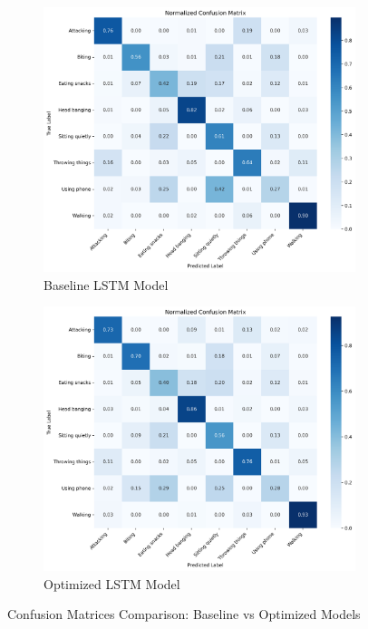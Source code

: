\documentclass[a4paper,11pt]{article}
\begin{document}
\begin{figure}[H]
\centering
\begin{subfigure}{0.48\textwidth}
    \centering
    \includegraphics[width=\textwidth]{results/metrics/baseline/confusion_matrix.png}
    \caption{Baseline LSTM Model}
    \label{fig:baseline_confusion}
\end{subfigure}
\hfill
\begin{subfigure}{0.48\textwidth}
    \centering
    \includegraphics[width=\textwidth]{results/metrics/optimized/confusion_matrix.png}
    \caption{Optimized LSTM Model}
    \label{fig:optimized_confusion}
\end{subfigure}
\caption{Confusion Matrices Comparison: Baseline vs Optimized Models}
\label{fig:confusion_matrices}
\end{figure}
\end{document}
